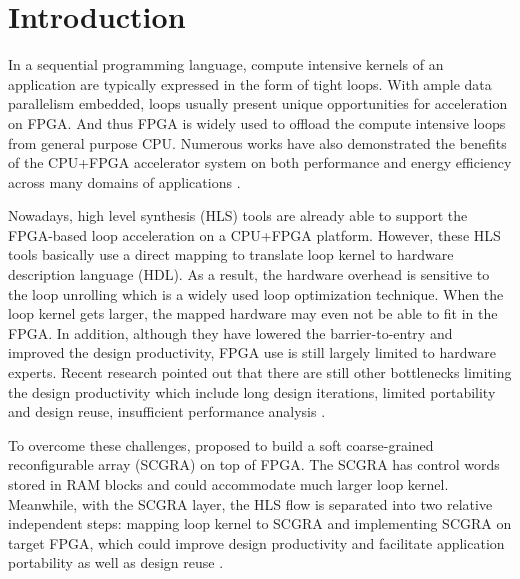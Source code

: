 \documentclass[12pt]{article} %
\begin{document}
\newpage %

\section{Introduction} %
In a sequential programming language, compute intensive kernels of an application are
typically expressed in the form of tight loops. With ample data parallelism embedded, loops
usually present unique opportunities for acceleration on FPGA. And thus FPGA is widely used to
offload the compute intensive loops from general purpose CPU. Numerous works have also demonstrated the
benefits of the CPU+FPGA accelerator system on both performance and energy efficiency across many domains
of applications\cite{app-acc} \cite{random-gen} \cite{classifier}.

Nowadays, high level synthesis (HLS) tools \cite{Impulse-c} \cite{vivado} \cite{legup} are already
able to support the FPGA-based loop acceleration on a CPU+FPGA platform. However, these HLS
tools basically use a direct mapping to translate loop kernel to hardware description language
(HDL). As a result, the hardware overhead is sensitive to the loop unrolling which is a widely used
loop optimization technique. When the loop kernel gets larger, the mapped hardware may even not be
able to fit in the FPGA. In addition, although they have lowered the barrier-to-entry and improved
the design productivity, FPGA use is still largely limited to hardware experts. Recent research
pointed out that there are still other bottlenecks limiting the design productivity which include
long design iterations, limited portability and design reuse, insufficient performance analysis
\cite{design-productivity} \cite{EndToEnd}.

To overcome these challenges, \cite{colinheart} proposed to build a soft coarse-grained
reconfigurable array (SCGRA) on top of FPGA. The SCGRA has control words stored in RAM blocks and
could accommodate much larger loop kernel. Meanwhile, with the SCGRA layer, the HLS flow is
separated into two relative independent steps: mapping loop kernel to SCGRA and implementing SCGRA
on target FPGA, which could improve design productivity and facilitate application portability as
well as design reuse \cite{design-productivity}.
\end{document}

